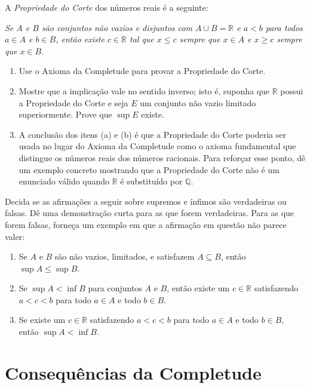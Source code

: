 \begin{exercise}\label{ex:propriedade-corte}
A \textit{Propriedade do Corte} dos números reais é a seguinte:

\textit{Se $A$ e $B$ são conjuntos não vazios e disjuntos com $A \cup B = \mathbb{R}$ e $a < b$ para todos $a \in A$ e $b \in B$, então existe $c \in \mathbb{R}$ tal que $x \leq c$ sempre que $x \in A$ e $x \geq c$ sempre que $x \in B$.}
\begin{enumerate}[label=\alph*)]
\item Use o Axioma da Completude para provar a Propriedade do Corte.
\item Mostre que a implicação vale no sentido inverso; isto é, suponha que $\mathbb{R}$ possui a Propriedade do Corte e seja $E$ um conjunto não vazio limitado superiormente. Prove que $\sup E$ existe.
\item A conclusão dos itens (a) e (b) é que a Propriedade do Corte poderia ser usada no lugar do Axioma da Completude como o axioma fundamental que distingue os números reais dos números racionais. Para reforçar esse ponto, dê um exemplo concreto mostrando que a Propriedade do Corte não é um enunciado válido quando $\mathbb{R}$ é substituído por $\mathbb{Q}$.
\end{enumerate}
\end{exercise}

\begin{exercise}\label{ex:verdadeiro-falso-sup-inf}
Decida se as afirmações a seguir sobre supremos e ínfimos são verdadeiras ou falsas. Dê uma demonstração curta para as que forem verdadeiras. Para as que forem falsas, forneça um exemplo em que a afirmação em questão não parece valer:
\begin{enumerate}[label=\alph*)]
\item Se $A$ e $B$ são não vazios, limitados, e satisfazem $A \subseteq B$, então $\sup A \leq \sup B$.
\item Se $\sup A < \inf B$ para conjuntos $A$ e $B$, então existe um $c \in \mathbb{R}$ satisfazendo $a < c < b$ para todo $a \in A$ e todo $b \in B$.
\item Se existe um $c \in \mathbb{R}$ satisfazendo $a < c < b$ para todo $a \in A$ e todo $b \in B$, então $\sup A < \inf B$.
\end{enumerate}
\end{exercise}


\section{Consequências da Completude}\label{sec:consequencias-completude}

